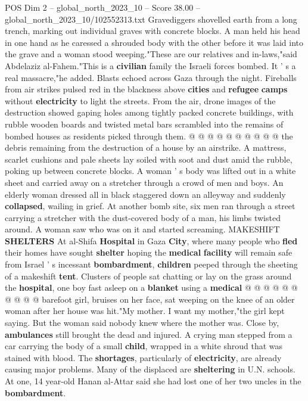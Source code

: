 \begin{textsample}{POS Dim 2 – global\_north\_2023\_10 – Score 38.00 – global\_north\_2023\_10/102552313.txt}
Gravediggers shovelled earth from a long trench, marking out individual graves with concrete blocks.
A man held his head in one hand as he caressed a shrouded body with the other before it was laid into the grave and a woman stood weeping."These are our relatives and in-laws,"said Abdelaziz al-Fahem."This is a \textbf{civilian} family the Israeli forces bombed.
It ' s a real massacre,"he added.
Blasts echoed across Gaza through the night.
Fireballs from air strikes pulsed red in the blackness above \textbf{cities} and \textbf{refugee} \textbf{camps} without \textbf{electricity} to light the streets.
From the air, drone images of the destruction showed gaping holes among tightly packed concrete buildings, with rubble wooden boards and twisted metal bars scrambled into the remains of bombed houses as residents picked through them. @ @ @ @ @ @ @ @ @ @ the debris remaining from the destruction of a house by an airstrike.
A mattress, scarlet cushions and pale sheets lay soiled with soot and dust amid the rubble, poking up between concrete blocks.
A woman ' s body was lifted out in a white sheet and carried away on a stretcher through a crowd of men and boys.
An elderly woman dressed all in black staggered down an alleyway and suddenly \textbf{collapsed}, wailing in grief.
At another bomb site, six men ran through a street carrying a stretcher with the dust-covered body of a man, his limbs twisted around.
A woman saw who was on it and started screaming.
MAKESHIFT \textbf{SHELTERS} At al-Shifa \textbf{Hospital} in Gaza \textbf{City}, where many people who \textbf{fled} their homes have sought \textbf{shelter} hoping the \textbf{medical} \textbf{facility} will remain safe from Israel ' s incessant \textbf{bombardment}, \textbf{children} peeped through the sheeting of a makeshift \textbf{tent}.
Clusters of people sat chatting or lay on the grass around the \textbf{hospital}, one boy fast asleep on a \textbf{blanket} using a \textbf{medical} @ @ @ @ @ @ @ @ @ @ barefoot girl, bruises on her face, sat weeping on the knee of an older woman after her house was hit."My mother.
I want my mother,"the girl kept saying.
But the woman said nobody knew where the mother was.
Close by, \textbf{ambulances} still brought the dead and injured.
A crying man stepped from a car carrying the body of a small \textbf{child}, wrapped in a white shroud that was stained with blood.
The \textbf{shortages}, particularly of \textbf{electricity}, are already causing major problems.
Many of the displaced are \textbf{sheltering} in U.N. schools.
At one, 14 year-old Hanan al-Attar said she had lost one of her two uncles in the \textbf{bombardment}.

\end{textsample}
